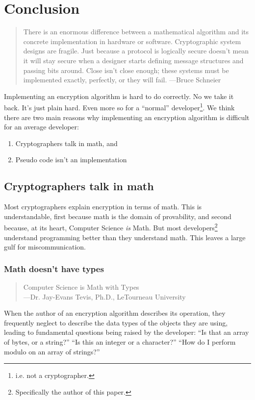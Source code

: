 \section{Conclusion}

\blockquote[\cite{Schneier:Harder}]{There is an enormous difference between a mathematical algorithm and its concrete implementation in hardware or software. Cryptographic system designs are fragile. Just because a protocol is logically secure doesn't mean it will stay secure when a designer starts defining message structures and passing bits around. Close isn't close enough; these systems must be implemented exactly, perfectly, or they will fail. ---Bruce Schneier}

Implementing an encryption algorithm is hard to do correctly. No we take it back. It's just plain hard. Even more so for a \enquote{normal} developer\footnote{i.e. not a cryptographer.}. We think there are two main reasons why implementing an encryption algorithm is difficult for an average developer:

\begin{enumerate}
\item Cryptographers talk in math, and
\item Pseudo code isn't an implementation
\end{enumerate}

\subsection{Cryptographers talk in math}

Most cryptographers explain encryption in terms of math. This is understandable, first because math is the domain of provability, and second because, at its heart, Computer Science \emph{is} Math. But most developers\footnote{Specifically the author of this paper.} understand programming better than they understand math. This leaves a large gulf for miscommunication.

\subsubsection{Math doesn't have types}
\blockquote{Computer Science is Math with Types\\ ---Dr. Jay-Evans Tevis, Ph.D., LeTourneau University}

When the author of an encryption algorithm describes its operation, they frequently neglect to describe the data types of the objects they are using, leading to fundamental questions being raised by the developer: 
\enquote{Is that an array of bytes, or a string?}
\enquote{Is this an integer or a character?}
\enquote{How do I perform modulo on an array of strings?}

